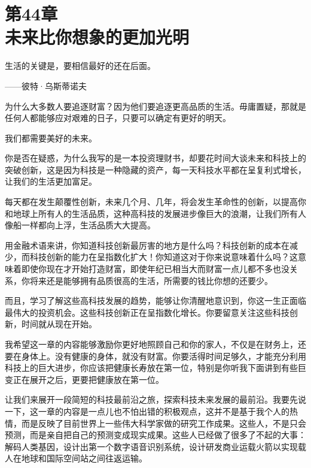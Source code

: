 
\section[第44章\q 未来比你想象的更加光明]{第44章\\ 未来比你想象的更加光明}

\begin{BookQuote}
生活的关键是，要相信最好的还在后面。

\hfill ——彼特·乌斯蒂诺夫
\end{BookQuote}

为什么大多数人要追逐财富？因为他们要追逐更高品质的生活。毋庸置疑，那就是任何人都能够应对艰难的日子，只要可以确定有更好的明天。

我们都需要美好的未来。

你是否在疑惑，为什么我写的是一本投资理财书，却要花时间大谈未来和科技上的突破创新，这是因为科技是一种隐藏的资产，每一天科技水平都在呈复利式增长，让我们的生活更加富足。

每天都在发生颠覆性创新，未来几个月、几年，将会发生革命性的创新，以提高你和地球上所有人的生活品质，这种高科技的发展进步像巨大的浪潮，让我们所有人像船一样都向上浮，生活品质大大提高。

用金融术语来讲，你知道科技创新最厉害的地方是什么吗？科技创新的成本在减少，而科技创新的能力在呈指数化扩大！你知道这对于你来说意味着什么吗？这意味着即使你现在才开始打造财富，即使年纪已相当大而财富一点儿都不多也没关系，你将来还是能够拥有品质很高的生活，所需要的钱比你想的还要少。

而且，学习了解这些高科技发展的趋势，能够让你清醒地意识到，你这一生正面临最伟大的投资机会。这些科技创新正在呈指数化增长。你要留意关注这些科技创新，时间就从现在开始。

我希望这一章的内容能够激励你更好地照顾自己和你的家人，不仅是在财务上，还要在身体上。没有健康的身体，就没有财富。你要活得时间足够久，才能充分利用科技上的巨大进步，你应该把健康长寿放在第一位，特别是你听我下面讲到有些巨变正在展开之后，更要把健康放在第一位。

让我们来展开一段简短的科技最前沿之旅，探索科技未来发展的最前沿。我要先说一下，这一章的内容是一点儿也不怕出错的积极观点，这并不是基于我个人的热情，而是反映了目前世界上一些伟大科学家做的研究工作成果。这些人，不是只会预测，而是亲自把自己的预测变成现实成果。这些人已经做了很多了不起的大事：解码人类基因，设计出第一个数字语音识别系统，设计研发商业运载火箭以实现载人在地球和国际空间站之间往返运输。

